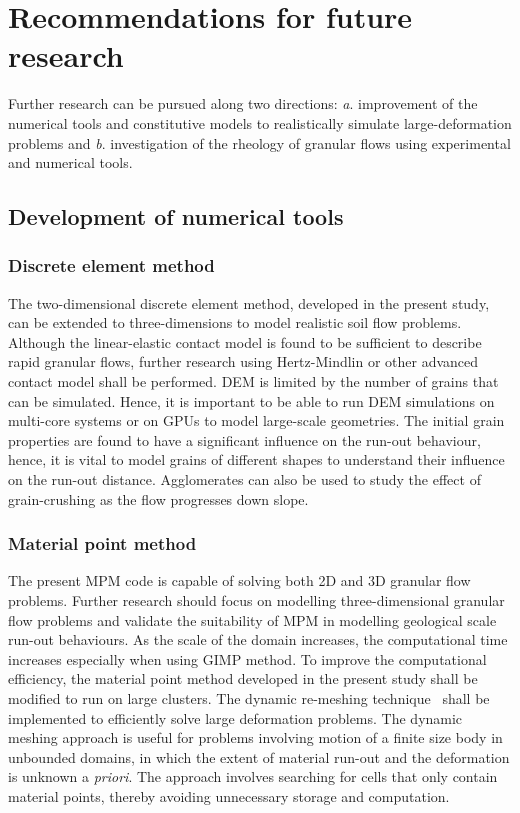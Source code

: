 \section{Recommendations for future research}

Further research can be pursued along two directions: \textit{a}. improvement 
of the numerical tools and constitutive models to realistically simulate 
large-deformation problems and \textit{b}. investigation of the rheology of 
granular flows using experimental and numerical tools.

\subsection{Development of numerical tools}

\subsubsection*{Discrete element method}

The two-dimensional discrete element method, developed in the present study, 
can be extended to three-dimensions to model realistic soil flow 
problems. Although the linear-elastic contact model is found to be sufficient 
to 
describe rapid granular flows, further research using Hertz-Mindlin or other 
advanced contact model shall be performed. DEM is limited by the number of 
grains that can be simulated. Hence, it is important to be able to run DEM 
simulations on multi-core systems or on GPUs to model large-scale geometries. 
The initial grain properties are found to have a 
significant influence on the run-out behaviour, hence, it is vital to model 
grains of different shapes to understand their influence on the run-out 
distance. Agglomerates can also be used to study the effect of grain-crushing 
as the flow progresses down slope.

\subsubsection*{Material point method}

The present MPM code is capable of solving both 2D and 3D granular flow 
problems. Further research should focus on modelling three-dimensional granular 
flow problems and validate the suitability of MPM in modelling geological scale 
run-out behaviours. As the scale of the domain increases, the computational 
time increases especially when using GIMP method. To improve the computational 
efficiency, the material point method developed in the present study shall be 
modified to run on large clusters. The dynamic re-meshing 
technique~\citep{Shin2010a} shall be implemented to efficiently solve 
large deformation problems. The dynamic meshing approach is useful for problems 
involving motion of a finite size body in unbounded domains, in which the 
extent of material run-out and the deformation is unknown a \textit{priori}. 
The approach involves searching for cells that only contain material points, 
thereby avoiding unnecessary storage and computation. 


